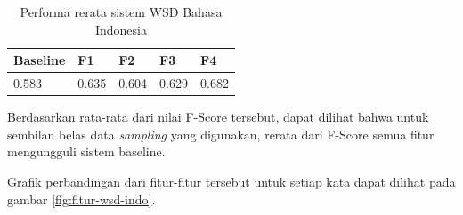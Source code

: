 \begin{table}
	\centering
	\caption{Performa rerata sistem WSD Bahasa Indonesia}
	\label{table:performa-rerata-wsd}
	\begin{tabular}{|p{2cm}|p{2cm}|p{2cm}|p{2cm}|p{2cm}|}
		\hline
		\textbf{Baseline} & \textbf{F1} & \textbf{F2} & \textbf{F3} & \textbf{F4} \\ \hline
		0.583 & 0.635 & 0.604 & 0.629 & 0.682 \\ \hline
	\end{tabular}
\end{table}

Berdasarkan rata-rata dari nilai F-Score tersebut, dapat dilihat bahwa untuk sembilan belas data \textit{sampling} yang digunakan, rerata dari F-Score semua fitur mengungguli sistem baseline.

Grafik perbandingan dari fitur-fitur tersebut untuk setiap kata dapat dilihat pada gambar \ref{fig:fitur-wsd-indo}.

